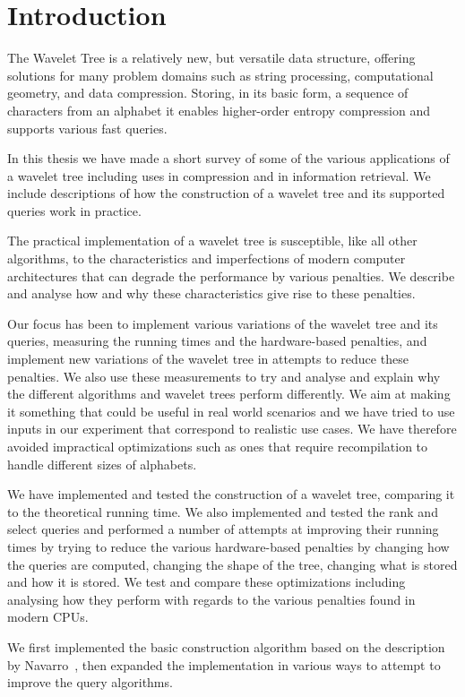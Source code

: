 \section{Introduction}
The Wavelet Tree is a relatively new, but versatile data structure, offering solutions for many problem domains such as string processing, computational geometry, and data compression.
Storing, in its basic form, a sequence of characters from an alphabet it enables higher-order entropy compression and supports various fast queries.

In this thesis we have made a short survey of some of the various applications of a wavelet tree including uses in compression and in information retrieval.
We include descriptions of how the construction of a wavelet tree and its supported queries work in practice.

The practical implementation of a wavelet tree is susceptible, like all other algorithms, to the characteristics and imperfections of modern computer architectures that can degrade the performance by various penalties.
We describe and analyse how and why these characteristics give rise to these penalties.

Our focus has been to implement various variations of the wavelet tree and its queries, measuring the running times and the hardware-based penalties, and implement new variations of the wavelet tree in attempts to reduce these penalties.
We also use these measurements to try and analyse and explain why the different algorithms and wavelet trees perform differently.
We aim at making it something that could be useful in real world scenarios and we have tried to use inputs in our experiment that correspond to realistic use cases.
We have therefore avoided impractical optimizations such as ones that require recompilation to handle different sizes of alphabets.

We have implemented and tested the construction of a wavelet tree, comparing it to the theoretical running time.
We also implemented and tested the rank and select queries and performed a number of attempts at improving their running times by trying to reduce the various hardware-based penalties by changing how the queries are computed, changing the shape of the tree, changing what is stored and how it is stored.
We test and compare these optimizations including analysing how they perform with regards to the various penalties found in modern CPUs.

We first implemented the basic construction algorithm based on the description by Navarro~, then expanded the implementation in various ways to attempt to improve the query algorithms.

